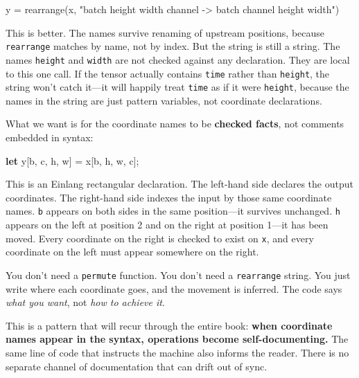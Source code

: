 \documentclass[11pt,titlepage]{article}
\newenvironment{Shaded}{}{}
\newcommand{\KeywordTok}[1]{\textcolor[rgb]{0.00,0.44,0.13}{\textbf{#1}}}
\newcommand{\NormalTok}[1]{#1}
\newcommand{\OperatorTok}[1]{\textcolor[rgb]{0.40,0.40,0.40}{#1}}
\newcommand{\StringTok}[1]{\textcolor[rgb]{0.25,0.44,0.63}{#1}}
\begin{document}
\begin{Shaded}
\begin{Highlighting}[]
\NormalTok{y }\OperatorTok{=}\NormalTok{ rearrange(x, }\StringTok{"batch height width channel -> batch channel height width"}\NormalTok{)}
\end{Highlighting}
\end{Shaded}

This is better. The names survive renaming of upstream positions,
because \texttt{rearrange} matches by name, not by index. But the string
is still a string. The names \texttt{height} and \texttt{width} are not
checked against any declaration. They are local to this one call. If the
tensor actually contains \texttt{time} rather than \texttt{height}, the
string won't catch it---it will happily treat \texttt{time} as if it
were \texttt{height}, because the names in the string are just pattern
variables, not coordinate declarations.

What we want is for the coordinate names to be \textbf{checked facts},
not comments embedded in syntax:

\begin{Shaded}
\begin{Highlighting}[]
\KeywordTok{let}\NormalTok{ y}\OperatorTok{[}\NormalTok{b, c, h, w}\OperatorTok{]}\NormalTok{ = x}\OperatorTok{[}\NormalTok{b, h, w, c}\OperatorTok{]}\NormalTok{;}
\end{Highlighting}
\end{Shaded}

This is an Einlang rectangular declaration. The left-hand side declares
the output coordinates. The right-hand side indexes the input by those
same coordinate names. \texttt{b} appears on both sides in the same
position---it survives unchanged. \texttt{h} appears on the left at
position 2 and on the right at position 1---it has been moved. Every
coordinate on the right is checked to exist on \texttt{x}, and every
coordinate on the left must appear somewhere on the right.

You don't need a \texttt{permute} function. You don't need a
\texttt{rearrange} string. You just write where each coordinate goes,
and the movement is inferred. The code says \emph{what you want}, not
\emph{how to achieve it}.

This is a pattern that will recur through the entire book: \textbf{when
coordinate names appear in the syntax, operations become
self-documenting.} The same line of code that instructs the machine also
informs the reader. There is no separate channel of documentation that
can drift out of sync.
\end{document}

